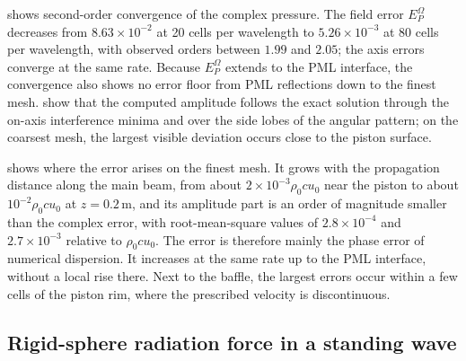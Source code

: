 \documentclass[final,12pt,nopreprintline,longtitle]{elsarticle}
\begin{document}
 shows second-order convergence of the complex
pressure.  The field error $E_P^{\Omega}$ decreases from
$8.63\times10^{-2}$ at 20 cells per wavelength to $5.26\times10^{-3}$ at 80
cells per wavelength, with observed orders between $1.99$ and $2.05$; the axis
errors converge at the same rate.  Because $E_P^{\Omega}$ extends to the PML
interface, the convergence also shows no error floor from PML reflections down
to the finest mesh.   show
that the computed amplitude follows the exact solution through the on-axis
interference minima and over the side lobes of the angular pattern; on the
coarsest mesh, the largest visible deviation occurs close to the piston
surface.

 shows where the error arises on the finest mesh.
It grows with the propagation distance along the main beam, from about
$2\times10^{-3}\rho_0cu_0$ near the piston to about $10^{-2}\rho_0cu_0$ at
$z=0.2\,\mathrm{m}$, and its amplitude part is an order of magnitude smaller
than the complex error, with root-mean-square values of $2.8\times10^{-4}$ and
$2.7\times10^{-3}$ relative to $\rho_0cu_0$.  The error is therefore mainly
the phase error of numerical dispersion.  It increases at the same rate up to
the PML interface, without a local rise there.  Next to the baffle, the
largest errors occur within a few cells of the piston rim, where the
prescribed velocity is discontinuous.

\FloatBarrier
\subsection{Rigid-sphere radiation force in a standing wave}
\label{sec:gorkovVerification}
\end{document}
